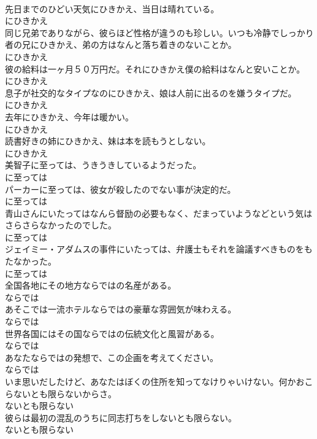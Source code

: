 \documentclass[8pt]{extreport}
\begin{document}
\begin{CJK}{UTF8}{min}
\\	先日までのひどい天気にひきかえ、当日は晴れている。	
\\	にひきかえ
\\	同じ兄弟でありながら、彼らほど性格が違うのも珍しい。いつも冷静でしっかり者の兄にひきかえ、弟の方はなんと落ち着きのないことか。	
\\	にひきかえ
\\	彼の給料は一ヶ月５０万円だ。それにひきかえ僕の給料はなんと安いことか。	
\\	にひきかえ
\\	息子が社交的なタイプなのにひきかえ、娘は人前に出るのを嫌うタイプだ。	
\\	にひきかえ
\\	去年にひきかえ、今年は暖かい。	
\\	にひきかえ
\\	読書好きの姉にひきかえ、妹は本を読もうとしない。	
\\	にひきかえ
\\	美智子に至っては、うきうきしているようだった。	
\\	に至っては
\\	パーカーに至っては、彼女が殺したのでない事が決定的だ。	
\\	に至っては
\\	青山さんにいたってはなんら督励の必要もなく、だまっていようなどという気はさらさらなかったのでした。	
\\	に至っては
\\	ジェイミー・アダムスの事件にいたっては、弁護士もそれを論議すべきものをもたなかった。	
\\	に至っては
\\	全国各地にその地方ならではの名産がある。	
\\	ならでは
\\	あそこでは一流ホテルならではの豪華な雰囲気が味わえる。	
\\	ならでは
\\	世界各国にはその国ならではの伝統文化と風習がある。	
\\	ならでは
\\	あなたならではの発想で、この企画を考えてください。	
\\	ならでは
\\	いま思いだしたけど、あなたはぼくの住所を知ってなけりゃいけない。何かおこらないとも限らないからさ。	
\\	ないとも限らない
\\	彼らは最初の混乱のうちに同志打ちをしないとも限らない。	
\\	ないとも限らない

\end{CJK}
\end{document}
